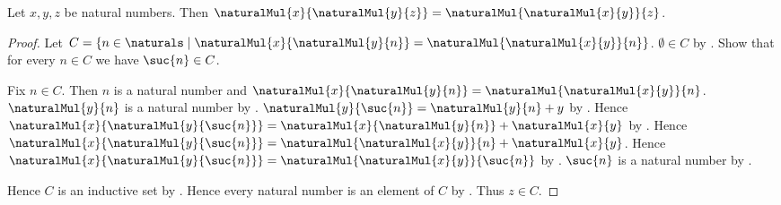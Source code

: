 \begin{theorem}\label{natural_multiplication_associative}
    Let $x,y,z$ be natural numbers.
    Then $\naturalMul{x}{\naturalMul{y}{z}}
        =\naturalMul{\naturalMul{x}{y}}{z}$.
\end{theorem}
\begin{proof}
    Let $C=\{n\in\naturals\mid
        \text{$\naturalMul{x}{\naturalMul{y}{n}}
            =\naturalMul{\naturalMul{x}{y}}{n}$}\}$.
    $\emptyset\in C$
        by .
    Show that for every $n\in C$ we have $\suc{n}\in C$.
    \begin{subproof}
        Fix $n\in C$.
        Then $n$ is a natural number and
            $\naturalMul{x}{\naturalMul{y}{n}}
                =\naturalMul{\naturalMul{x}{y}}{n}$.
        $\naturalMul{y}{n}$ is a natural number
            by .
        $\naturalMul{y}{\suc{n}}=\naturalMul{y}{n}+y$
            by .
        Hence $\naturalMul{x}{\naturalMul{y}{\suc{n}}}
            =\naturalMul{x}{\naturalMul{y}{n}}
                +\naturalMul{x}{y}$
            by .
        Hence $\naturalMul{x}{\naturalMul{y}{\suc{n}}}
            =\naturalMul{\naturalMul{x}{y}}{n}
                +\naturalMul{x}{y}$.
        Hence $\naturalMul{x}{\naturalMul{y}{\suc{n}}}
            =\naturalMul{\naturalMul{x}{y}}{\suc{n}}$
            by .
        $\suc{n}$ is a natural number by .
    \end{subproof}
    Hence $C$ is an inductive set by .
    Hence every natural number is an element of $C$
        by .
    Thus $z\in C$.
\end{proof}
